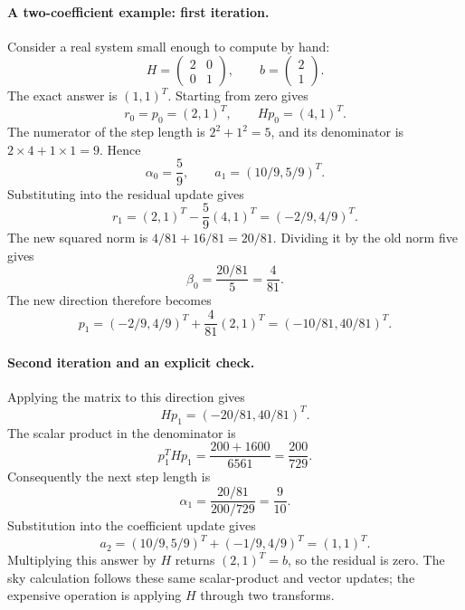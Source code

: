 \documentclass[11pt]{article}
\begin{document}
\paragraph{A two-coefficient example: first iteration.}
Consider a real system small enough to compute by hand:
\begin{equation}
 H=\begin{pmatrix}2&0\\0&1\end{pmatrix},\qquad
 b=\begin{pmatrix}2\\1\end{pmatrix}.
\end{equation}
The exact answer is $(1,1)^T$. Starting from zero gives
\begin{equation}
 r_0=p_0=(2,1)^T,\qquad Hp_0=(4,1)^T.
\end{equation}
The numerator of the step length is $2^2+1^2=5$, and its denominator is
$2\times4+1\times1=9$. Hence
\begin{equation}
 \alpha_0=\frac59,\qquad a_1=(10/9,5/9)^T.
\end{equation}
Substituting into the residual update gives
\begin{equation}
 r_1=(2,1)^T-\frac59(4,1)^T=(-2/9,4/9)^T.
\end{equation}
The new squared norm is $4/81+16/81=20/81$. Dividing it by the old norm
five gives
\begin{equation}
 \beta_0=\frac{20/81}{5}=\frac4{81}.
\end{equation}
The new direction therefore becomes
\begin{equation}
 p_1=(-2/9,4/9)^T+\frac4{81}(2,1)^T=(-10/81,40/81)^T.
\end{equation}

\paragraph{Second iteration and an explicit check.}
Applying the matrix to this direction gives
\begin{equation}
 Hp_1=(-20/81,40/81)^T.
\end{equation}
The scalar product in the denominator is
\begin{equation}
 p_1^THp_1=\frac{200+1600}{6561}=\frac{200}{729}.
\end{equation}
Consequently the next step length is
\begin{equation}
 \alpha_1=\frac{20/81}{200/729}=\frac9{10}.
\end{equation}
Substitution into the coefficient update gives
\begin{equation}
 a_2=(10/9,5/9)^T+(-1/9,4/9)^T=(1,1)^T.
\end{equation}
Multiplying this answer by $H$ returns $(2,1)^T=b$, so the residual is
zero. The sky calculation follows these same scalar-product and vector
updates; the expensive operation is applying $H$ through two transforms.
\end{document}
